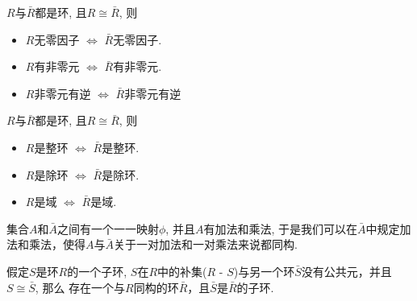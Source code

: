 \begin{Proposition}
$R$与$\bar{R}$都是环, 且$R \cong \bar{R}$, 则
\begin{itemize}
	\item $R$无零因子 $\Leftrightarrow$ $\bar{R}$无零因子.
	\item $R$有非零元 $\Leftrightarrow$ $\bar{R}$有非零元.
	\item  $R$非零元有逆 $\Leftrightarrow$ $\bar{R}$非零元有逆
\end{itemize}
\end{Proposition}

\begin{Theorem}
$R$与$\bar{R}$都是环, 且$R \cong \bar{R}$, 则
\begin{itemize}
	\item $R$是整环 $\Leftrightarrow$ $\bar{R}$是整环.
	\item  $R$是除环 $\Leftrightarrow$ $\bar{R}$是除环.
	\item  $R$是域 $\Leftrightarrow$ $\bar{R}$是域.
\end{itemize}
\end{Theorem}

\begin{Lemma}
集合$A$和$\bar{A}$之间有一个一一映射$\phi$, 并且$A$有加法和乘法, 于是我们可以在$\bar{A}$中规定加法和乘法，使得$A$与$\bar{A}$关于一对加法和一对乘法来说都同构.
\end{Lemma}

\begin{Theorem}
假定$S$是环$R$的一个子环, $S$在$R$中的补集($R$ - $S$)与另一个环$\bar{S}$没有公共元，并且$S \cong \bar{S}$, 那么
存在一个与$R$同构的环$\bar{R}$，且$\bar{S}$是$\bar{R}$的子环.
\end{Theorem}

\newcommand{\StubSize}{0.5em}%


